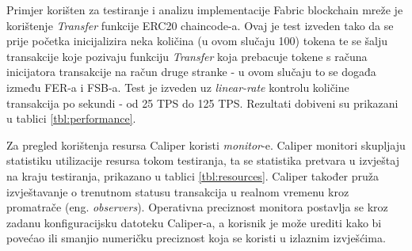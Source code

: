 \documentclass[times, utf8, diplomski]{fer}
\begin{document}
Primjer korišten za testiranje i analizu implementacije Fabric blockchain mreže je korištenje \textit{Transfer} funkcije ERC20 chaincode-a. Ovaj je test izveden tako da se prije početka inicijalizira neka količina (u ovom slučaju 100) tokena te se šalju transakcije koje pozivaju funkciju \textit{Transfer} koja prebacuje tokene s računa inicijatora transakcije na račun druge stranke - u ovom slučaju to se događa između FER-a i FSB-a.  Test je izveden uz \textit{linear-rate} kontrolu količine transakcija po sekundi - od 25 TPS do 125 TPS. Rezultati dobiveni su prikazani u tablici \ref{tbl:performance}.


\begin{table}[htb]
\centering
\caption{Performanse}
\label{tbl:performance}
\end{table}

Za pregled korištenja resursa Caliper koristi \textit{monitor}-e.  Caliper monitori skupljaju statistiku utilizacije resursa tokom testiranja,  ta se statistika pretvara u izvještaj na kraju testiranja,  prikazano u tablici \ref{tbl:resources}. Caliper također pruža izvještavanje o trenutnom statusu transakcija u realnom vremenu kroz promatrače (eng. \textit{observers}).  Operativna preciznost monitora postavlja se kroz zadanu konfiguracijsku datoteku Caliper-a, a korisnik je može urediti kako bi povećao ili smanjio numeričku preciznost koja se koristi u izlaznim izvješćima.
\end{document}
